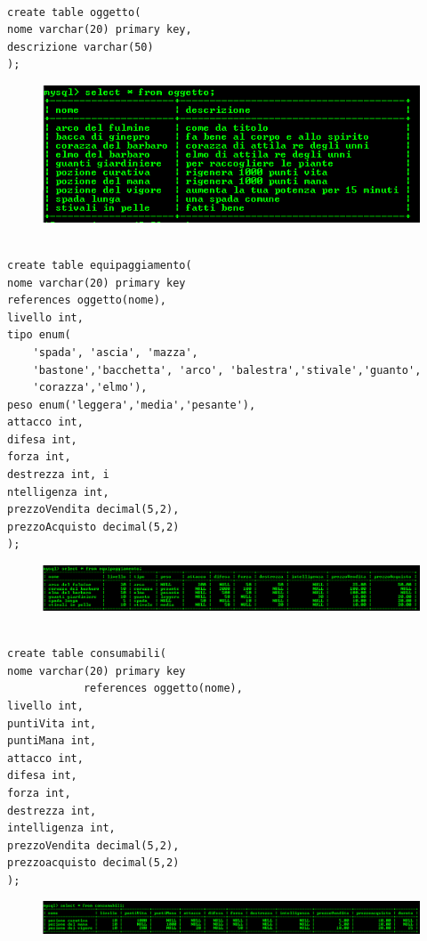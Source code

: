 \begin{verbatim}

create table oggetto( 
nome varchar(20) primary key, 
descrizione varchar(50)
);
\end{verbatim}

\begin{figure}[H]
\centering
\includegraphics[width=0.7\linewidth]{immagini/7}
\caption{}
\label{fig:1}
\end{figure}

\begin{verbatim}

create table equipaggiamento(
nome varchar(20) primary key 
references oggetto(nome), 
livello int, 
tipo enum(
	'spada', 'ascia', 'mazza',
	'bastone','bacchetta', 'arco', 'balestra','stivale','guanto',
	'corazza','elmo'), 
peso enum('leggera','media','pesante'), 
attacco int, 
difesa int, 
forza int, 
destrezza int, i
ntelligenza int, 
prezzoVendita decimal(5,2), 
prezzoAcquisto decimal(5,2)
);
\end{verbatim}

\begin{figure}[H]
\centering
\includegraphics[width=0.7\linewidth]{immagini/8}
\caption{}
\label{fig:1}
\end{figure}

\begin{verbatim}

create table consumabili( 
nome varchar(20) primary key 
			references oggetto(nome), 
livello int, 
puntiVita int, 
puntiMana int, 
attacco int, 
difesa int, 
forza int, 
destrezza int,
intelligenza int, 
prezzoVendita decimal(5,2), 
prezzoacquisto decimal(5,2)
);
\end{verbatim}

\begin{figure}[H]
\centering
\includegraphics[width=0.7\linewidth]{immagini/9}
\caption{}
\label{fig:1}
\end{figure}

